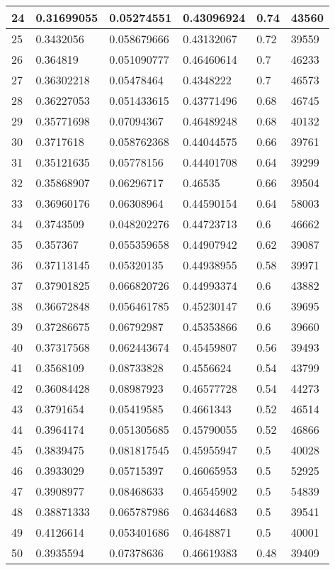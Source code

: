 \begin{longtable}{|l|l|l|l|l|l|}
24 & 0.31699055 & 0.05274551 & 0.43096924 & 0.74 & 43560 \\ \hline 
25 & 0.3432056 & 0.058679666 & 0.43132067 & 0.72 & 39559 \\ \hline 
26 & 0.364819 & 0.051090777 & 0.46460614 & 0.7 & 46233 \\ \hline 
27 & 0.36302218 & 0.05478464 & 0.4348222 & 0.7 & 46573 \\ \hline 
28 & 0.36227053 & 0.051433615 & 0.43771496 & 0.68 & 46745 \\ \hline 
29 & 0.35771698 & 0.07094367 & 0.46489248 & 0.68 & 40132 \\ \hline 
30 & 0.3717618 & 0.058762368 & 0.44044575 & 0.66 & 39761 \\ \hline 
31 & 0.35121635 & 0.05778156 & 0.44401708 & 0.64 & 39299 \\ \hline 
32 & 0.35868907 & 0.06296717 & 0.46535 & 0.66 & 39504 \\ \hline 
33 & 0.36960176 & 0.06308964 & 0.44590154 & 0.64 & 58003 \\ \hline 
34 & 0.3743509 & 0.048202276 & 0.44723713 & 0.6 & 46662 \\ \hline 
35 & 0.357367 & 0.055359658 & 0.44907942 & 0.62 & 39087 \\ \hline 
36 & 0.37113145 & 0.05320135 & 0.44938955 & 0.58 & 39971 \\ \hline 
37 & 0.37901825 & 0.066820726 & 0.44993374 & 0.6 & 43882 \\ \hline 
38 & 0.36672848 & 0.056461785 & 0.45230147 & 0.6 & 39695 \\ \hline 
39 & 0.37286675 & 0.06792987 & 0.45353866 & 0.6 & 39660 \\ \hline 
40 & 0.37317568 & 0.062443674 & 0.45459807 & 0.56 & 39493 \\ \hline 
41 & 0.3568109 & 0.08733828 & 0.4556624 & 0.54 & 43799 \\ \hline 
42 & 0.36084428 & 0.08987923 & 0.46577728 & 0.54 & 44273 \\ \hline 
43 & 0.3791654 & 0.05419585 & 0.4661343 & 0.52 & 46514 \\ \hline 
44 & 0.3964174 & 0.051305685 & 0.45790055 & 0.52 & 46866 \\ \hline 
45 & 0.3839475 & 0.081817545 & 0.45955947 & 0.5 & 40028 \\ \hline 
46 & 0.3933029 & 0.05715397 & 0.46065953 & 0.5 & 52925 \\ \hline 
47 & 0.3908977 & 0.08468633 & 0.46545902 & 0.5 & 54839 \\ \hline 
48 & 0.38871333 & 0.065787986 & 0.46344683 & 0.5 & 39541 \\ \hline 
49 & 0.4126614 & 0.053401686 & 0.4648871 & 0.5 & 40001 \\ \hline 
50 & 0.3935594 & 0.07378636 & 0.46619383 & 0.48 & 39409 \\ \hline 
\end{longtable}